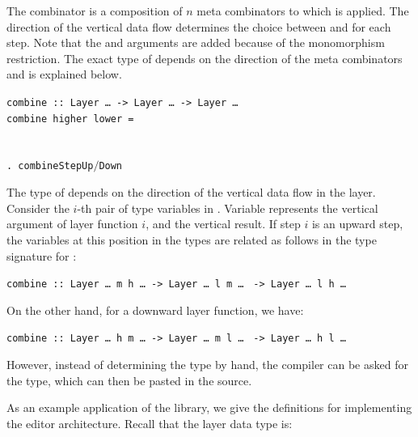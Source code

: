 \documentclass[preprint,natbib]{sigplanconf}
\begin{document}
The  combinator is a composition of $n$  meta combinators to which  is applied. The direction of the vertical data flow determines the choice between  and  for each step. \bc Note that the  and  arguments are added because of the monomorphism restriction. \ec The exact type of  depends on the direction of the meta combinators and is explained below. 

\begin{small}
\begin{tabbing}
{\tt combine}\verb| :: |{\tt Layer \dots}\verb| -> |{\tt Layer \dots}\verb| -> |{\tt Layer \dots }\\
{\tt co}\={\tt mbin}\={\tt e higher lower = }\\
\\
\>\>{\tt \dots}\\ 
\>\>\verb|. combine|{\tt StepUp$/$Down}\\
\>
\end{tabbing}
\end{small}

The type of  depends on the direction of the vertical data flow in the layer. Consider the $i$-th pair of  type variables in . Variable  represents the vertical argument of layer function $i$, and  the vertical result. If step $i$ is an upward step, the variables at this position in the  types are related as follows in the type signature for :

\begin{small}
{\tt  combine :: Layer \dots~m h \dots}\verb| -> |{\tt Layer \dots~l m \dots} \verb| -> |{\tt Layer \dots~l h \dots}
\end{small}

On the other hand, for a downward layer function, we have:

\begin{small}
{\tt  combine :: Layer \dots~h m \dots}\verb| -> |{\tt Layer \dots~m l \dots} \verb| -> |{\tt Layer \dots~h l \dots}
\end{small}

However, instead of determining the type by hand, the compiler can be asked for the type, which can then be pasted in the source.


As an example application of the library, we give the definitions  for implementing the  editor architecture. Recall that the layer data type is:
\end{document}
